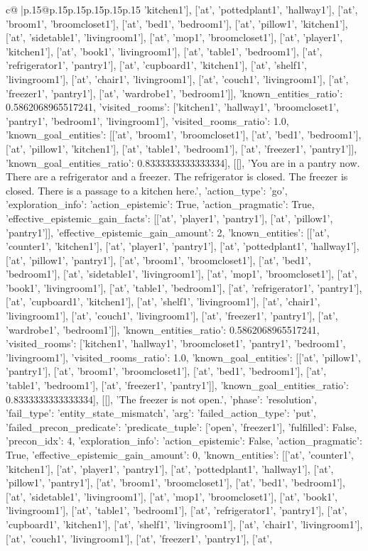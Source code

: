 \documentclass{article}
\begin{document}
{\begin{supertabular}{c@{$\;$}|p{.15\linewidth}@{}p{.15\linewidth}p{.15\linewidth}p{.15\linewidth}p{.15\linewidth}p{.15\linewidth}}
{{{'kitchen1'], ['at', 'pottedplant1', 'hallway1'], ['at', 'broom1', 'broomcloset1'], ['at', 'bed1', 'bedroom1'], ['at', 'pillow1', 'kitchen1'], ['at', 'sidetable1', 'livingroom1'], ['at', 'mop1', 'broomcloset1'], ['at', 'player1', 'kitchen1'], ['at', 'book1', 'livingroom1'], ['at', 'table1', 'bedroom1'], ['at', 'refrigerator1', 'pantry1'], ['at', 'cupboard1', 'kitchen1'], ['at', 'shelf1', 'livingroom1'], ['at', 'chair1', 'livingroom1'], ['at', 'couch1', 'livingroom1'], ['at', 'freezer1', 'pantry1'], ['at', 'wardrobe1', 'bedroom1']], 'known_entities_ratio': 0.5862068965517241, 'visited_rooms': ['kitchen1', 'hallway1', 'broomcloset1', 'pantry1', 'bedroom1', 'livingroom1'], 'visited_rooms_ratio': 1.0, 'known_goal_entities': [['at', 'broom1', 'broomcloset1'], ['at', 'bed1', 'bedroom1'], ['at', 'pillow1', 'kitchen1'], ['at', 'table1', 'bedroom1'], ['at', 'freezer1', 'pantry1']], 'known_goal_entities_ratio': 0.8333333333333334}}], [[], 'You are in a pantry now. There are a refrigerator and a freezer. The refrigerator is closed. The freezer is closed. There is a passage to a kitchen here.', {'action_type': 'go', 'exploration_info': {'action_epistemic': True, 'action_pragmatic': True, 'effective_epistemic_gain_facts': [['at', 'player1', 'pantry1'], ['at', 'pillow1', 'pantry1']], 'effective_epistemic_gain_amount': 2, 'known_entities': [['at', 'counter1', 'kitchen1'], ['at', 'player1', 'pantry1'], ['at', 'pottedplant1', 'hallway1'], ['at', 'pillow1', 'pantry1'], ['at', 'broom1', 'broomcloset1'], ['at', 'bed1', 'bedroom1'], ['at', 'sidetable1', 'livingroom1'], ['at', 'mop1', 'broomcloset1'], ['at', 'book1', 'livingroom1'], ['at', 'table1', 'bedroom1'], ['at', 'refrigerator1', 'pantry1'], ['at', 'cupboard1', 'kitchen1'], ['at', 'shelf1', 'livingroom1'], ['at', 'chair1', 'livingroom1'], ['at', 'couch1', 'livingroom1'], ['at', 'freezer1', 'pantry1'], ['at', 'wardrobe1', 'bedroom1']], 'known_entities_ratio': 0.5862068965517241, 'visited_rooms': ['kitchen1', 'hallway1', 'broomcloset1', 'pantry1', 'bedroom1', 'livingroom1'], 'visited_rooms_ratio': 1.0, 'known_goal_entities': [['at', 'pillow1', 'pantry1'], ['at', 'broom1', 'broomcloset1'], ['at', 'bed1', 'bedroom1'], ['at', 'table1', 'bedroom1'], ['at', 'freezer1', 'pantry1']], 'known_goal_entities_ratio': 0.8333333333333334}}], [[], 'The freezer is not open.', {'phase': 'resolution', 'fail_type': 'entity_state_mismatch', 'arg': {'failed_action_type': 'put', 'failed_precon_predicate': {'predicate_tuple': ['open', 'freezer1'], 'fulfilled': False, 'precon_idx': 4}}, 'exploration_info': {'action_epistemic': False, 'action_pragmatic': True, 'effective_epistemic_gain_amount': 0, 'known_entities': [['at', 'counter1', 'kitchen1'], ['at', 'player1', 'pantry1'], ['at', 'pottedplant1', 'hallway1'], ['at', 'pillow1', 'pantry1'], ['at', 'broom1', 'broomcloset1'], ['at', 'bed1', 'bedroom1'], ['at', 'sidetable1', 'livingroom1'], ['at', 'mop1', 'broomcloset1'], ['at', 'book1', 'livingroom1'], ['at', 'table1', 'bedroom1'], ['at', 'refrigerator1', 'pantry1'], ['at', 'cupboard1', 'kitchen1'], ['at', 'shelf1', 'livingroom1'], ['at', 'chair1', 'livingroom1'], ['at', 'couch1', 'livingroom1'], ['at', 'freezer1', 'pantry1'], ['at', }}}
\end{supertabular}}
\end{document}
